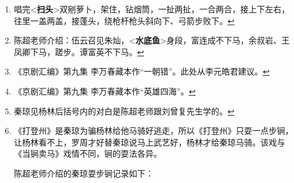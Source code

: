 \begin{enumerate}
  \protect\hyperlink{fnref317}{↩}
\item
  \leavevmode\hypertarget{fn318}{}%
  唱完\textless{}\textbf{扫头}\textgreater{}双剜萝卜，架住，钻烟筒，一扯两扯，一合两合，接上下左右，往里一盖两盖，接蓬头，绕枪杆枪头斜向下、弓箭步败下。\protect\hyperlink{fnref318}{↩}
\item
  \leavevmode\hypertarget{fn319}{}%
  陈超老师介绍：伍云召见朱灿，\textless{}\textbf{水底鱼}\textgreater{}身段，富连成不下马，余叔岩、王凤卿下马，蹉步。谭富英不下马。\protect\hyperlink{fnref319}{↩}
\item
  \leavevmode\hypertarget{fn320}{}%
  《京剧汇编》第九集
  李万春藏本作``一朝错''。此处从李元皓君建议。\protect\hyperlink{fnref320}{↩}
\item
  \leavevmode\hypertarget{fn321}{}%
  《京剧汇编》第九集
  李万春藏本作``英雄四海''。\protect\hyperlink{fnref321}{↩}
\item
  \leavevmode\hypertarget{fn322}{}%
  秦琼见杨林后括号内的对白是陈超老师跟刘曾复先生学的。\protect\hyperlink{fnref322}{↩}
\item
  \leavevmode\hypertarget{fn323}{}%
  《打登州》是秦琼为骗杨林给他马骑好逃走，所以《打登州》只耍一点步锏，让杨林看不上，罗周才好替秦琼说马上武艺好，杨林才给秦琼马骑。该戏与《当锏卖马》戏情不同，锏的耍法各异。

  陈超老师介绍的秦琼耍步锏记录如下：


\end{enumerate}
